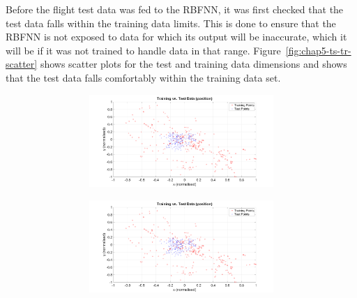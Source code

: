 Before the flight test data was fed to the RBFNN, it was first checked that the test data falls within the training data limits. This is done to ensure that the RBFNN is not exposed to data for which its output will be inaccurate, which it will be if it was not trained to handle data in that range. Figure~\ref{fig:chap5-ts-tr-scatter} shows scatter plots for the test and training data dimensions and shows that the test data falls comfortably within the training data set. 

\begin{figure}
  \centering
  \begin{subfigure}{\textwidth}
    \begin{subfigure}{0.48\textwidth}
      \includegraphics[clip, trim = 100 0 100 0, width=\textwidth]{figures/chapter5/tr_v_ts_xy}
    \end{subfigure}
    \begin{subfigure}{0.48\textwidth}
      \includegraphics[clip, trim = 100 0 100 0, width=\textwidth]{figures/chapter5/tr_v_ts_xy}
    \end{subfigure}
    \caption{}
  \end{subfigure}
  \begin{subfigure}{\textwidth}
    \begin{subfigure}{0.48\textwidth}

\end{subfigure}
\end{subfigure}
\end{figure}
